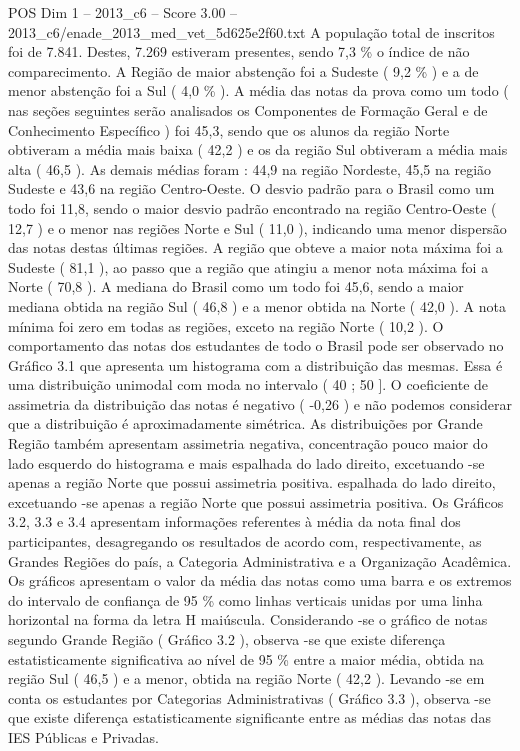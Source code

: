 \begin{textsample}{POS Dim 1 – 2013\_c6 – Score 3.00 – 2013\_c6/enade\_2013\_med\_vet\_5d625e2f60.txt}
A população total de inscritos foi de 7.841.
Destes, 7.269 estiveram presentes, sendo 7,3 \% o índice de não comparecimento.
A Região de maior abstenção foi a Sudeste ( 9,2 \% ) e a de menor abstenção foi a Sul ( 4,0 \% ).
A média das notas da prova como um todo ( nas seções seguintes serão analisados os Componentes de Formação Geral e de Conhecimento Específico ) foi 45,3, sendo que os alunos da região Norte obtiveram a média mais baixa ( 42,2 ) e os da região Sul obtiveram a média mais alta ( 46,5 ).
As demais médias foram : 44,9 na região Nordeste, 45,5 na região Sudeste e 43,6 na região Centro-Oeste.
O desvio padrão para o Brasil como um todo foi 11,8, sendo o maior desvio padrão encontrado na região Centro-Oeste ( 12,7 ) e o menor nas regiões Norte e Sul ( 11,0 ), indicando uma menor dispersão das notas destas últimas regiões.
A região que obteve a maior nota máxima foi a Sudeste ( 81,1 ), ao passo que a região que atingiu a menor nota máxima foi a Norte ( 70,8 ).
A mediana do Brasil como um todo foi 45,6, sendo a maior mediana obtida na região Sul ( 46,8 ) e a menor obtida na Norte ( 42,0 ).
A nota mínima foi zero em todas as regiões, exceto na região Norte ( 10,2 ).
O comportamento das notas dos estudantes de todo o Brasil pode ser observado no Gráfico 3.1 que apresenta um histograma com a distribuição das mesmas.
Essa é uma distribuição unimodal com moda no intervalo ( 40 ; 50 ].
O coeficiente de assimetria da distribuição das notas é negativo ( -0,26 ) e não podemos considerar que a distribuição é aproximadamente simétrica.
As distribuições por Grande Região também apresentam assimetria negativa, concentração pouco maior do lado esquerdo do histograma e mais espalhada do lado direito, excetuando -se apenas a região Norte que possui assimetria positiva. espalhada do lado direito, excetuando -se apenas a região Norte que possui assimetria positiva.
Os Gráficos 3.2, 3.3 e 3.4 apresentam informações referentes à média da nota final dos participantes, desagregando os resultados de acordo com, respectivamente, as Grandes Regiões do país, a Categoria Administrativa e a Organização Acadêmica.
Os gráficos apresentam o valor da média das notas como uma barra e os extremos do intervalo de confiança de 95 \% como linhas verticais unidas por uma linha horizontal na forma da letra H maiúscula.
Considerando -se o gráfico de notas segundo Grande Região ( Gráfico 3.2 ), observa -se que existe diferença estatisticamente significativa ao nível de 95 \% entre a maior média, obtida na região Sul ( 46,5 ) e a menor, obtida na região Norte ( 42,2 ).
Levando -se em conta os estudantes por Categorias Administrativas ( Gráfico 3.3 ), observa -se que existe diferença estatisticamente significante entre as médias das notas das IES Públicas e Privadas.

\end{textsample}
